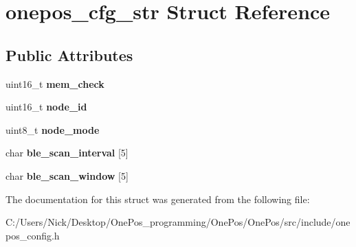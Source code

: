 \hypertarget{structonepos__cfg__str}{\section{onepos\-\_\-cfg\-\_\-str Struct Reference}
\label{structonepos__cfg__str}
}
\subsection*{Public Attributes}
\begin{DoxyCompactItemize}
\item 
\hypertarget{structonepos__cfg__str_a2ac704ecf27cea485871fa47290d40e4}{uint16\-\_\-t {\bfseries mem\-\_\-check}}\label{structonepos__cfg__str_a2ac704ecf27cea485871fa47290d40e4}

\item 
\hypertarget{structonepos__cfg__str_ae0f2e9880235da4e8cabee34fc25c862}{uint16\-\_\-t {\bfseries node\-\_\-id}}\label{structonepos__cfg__str_ae0f2e9880235da4e8cabee34fc25c862}

\item 
\hypertarget{structonepos__cfg__str_a76dfc31526c20aaedb2dfedd2a197861}{uint8\-\_\-t {\bfseries node\-\_\-mode}}\label{structonepos__cfg__str_a76dfc31526c20aaedb2dfedd2a197861}

\item 
\hypertarget{structonepos__cfg__str_aee3d513762912fbcc7b4422f594a7e9b}{char {\bfseries ble\-\_\-scan\-\_\-interval} \mbox{[}5\mbox{]}}\label{structonepos__cfg__str_aee3d513762912fbcc7b4422f594a7e9b}

\item 
\hypertarget{structonepos__cfg__str_a52d48546c85cefd28e2d506504dcfe54}{char {\bfseries ble\-\_\-scan\-\_\-window} \mbox{[}5\mbox{]}}\label{structonepos__cfg__str_a52d48546c85cefd28e2d506504dcfe54}

\end{DoxyCompactItemize}


The documentation for this struct was generated from the following file\-:\begin{DoxyCompactItemize}
\item 
C\-:/\-Users/\-Nick/\-Desktop/\-One\-Pos\-\_\-programming/\-One\-Pos/\-One\-Pos/src/include/onepos\-\_\-config.\-h\end{DoxyCompactItemize}
